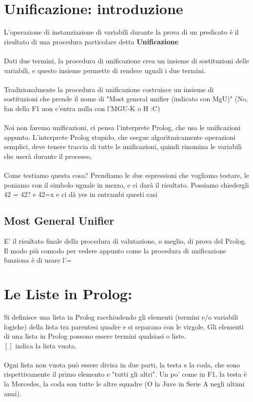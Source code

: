 \documentclass[12pt, a4paper, openany, oneside]{book}
\begin{document}
\section{Unificazione: introduzione}
L'operazione di instanziazione di variabili durante la prova di un predicato è il 
risultato di una procedura particolare detta \textbf{Unificazione} \\ \\
Dati due termini, la procedura di unificazione crea un insieme di sostituzioni 
delle variabili, e questo insieme permette di rendere uguali i due termini. \\
\\ 
Tradizionalmente la procedura di unificazione costruisce un insieme di sostituzioni
che prende il nome di "Most general unifier (indicato con MgU)" (No, fan della F1
non c'entra nulla con l'MGU-K o H :C)
\\ \\ 
Noi non faremo unificazioni, ci pensa l'interprete Prolog, che usa le 
unificazioni appunto. L'interprete Prolog stupido, che esegue algoritmicamente
operazioni semplici, deve tenere traccia di tutte le unificazioni, quindi rinomina
le variabili che userà durante il processo,
\\ \\
Come testiamo questa cosa? Prendiamo le due espressioni che vogliamo testare, le
poniamo con il simbolo uguale in mezzo, e ci darà il risultato. Possiamo chiedergli
42 = 42? e 42=x e ci dà yes in entrambi questi casi
\subsection{Most General Unifier} 
E' il risultato finale della procedura di valutazione, o meglio, di prova del 
Prolog. \\
Il modo più comodo per vedere appunto come la procedura di unificazione funziona 
è di usare l'=
\section{Le Liste in Prolog: }
Si definisce una lista in Prolog racchiudendo gli elementi (termini e/o variabili
logiche) della lista tra parentesi quadre e si separano con le virgole.
Gli elementi di una lista in Prolog possono essere termini qualsiasi o liste. \\
$[]$ indica la lista vuota.
\\ \\
Ogni lista non vuota può essere divisa in due parti, la testa e la coda, che sono
rispettivamente il primo elemento e "tutti gli altri". Un po' come in F1, la 
testa è la Mercedes, la coda son tutte le altre squadre (O la Juve in Serie A
negli ultimi anni).
\end{document}
